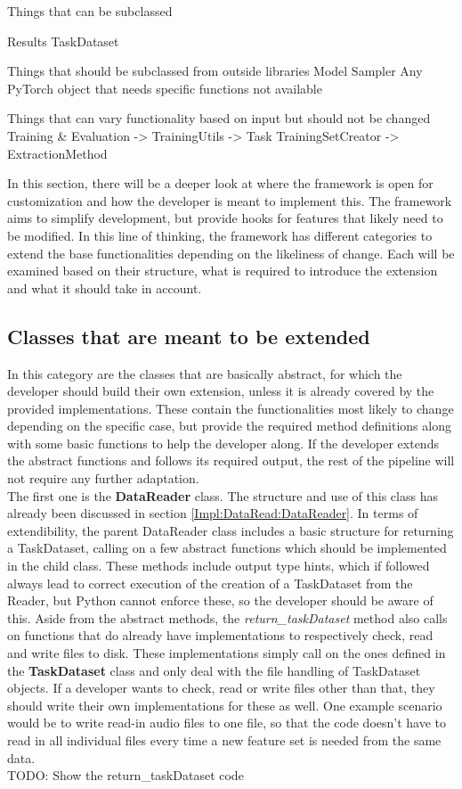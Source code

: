 Things that can be subclassed

Results
TaskDataset

Things that should be subclassed from outside libraries
Model
Sampler
Any PyTorch object that needs specific functions not available

Things that can vary functionality based on input but should not be changed
Training \& Evaluation
-> TrainingUtils
-> Task
TrainingSetCreator
-> ExtractionMethod

In this section, there will be a deeper look at where the framework is open for customization and how the developer is meant to implement this. The framework aims to simplify development, but provide hooks for features that likely need to be modified. In this line of thinking, the framework has different categories to extend the base functionalities depending on the likeliness of change. Each will be examined based on their structure, what is required to introduce the extension and what it should take in account. 

\subsection{Classes that are meant to be extended}

In this category are the classes that are basically abstract, for which the developer should build their own extension, unless it is already covered by the provided implementations. These contain the functionalities most likely to change depending on the specific case, but provide the required method definitions along with some basic functions to help the developer along. If the developer extends the abstract functions and follows its required output, the rest of the pipeline will not require any further adaptation. \\

The first one is the \textbf{DataReader} class. The structure and use of this class has already been discussed in section \ref{Impl:DataRead:DataReader}. In terms of extendibility, the parent DataReader class includes a basic structure for returning a TaskDataset, calling on a few abstract functions which should be implemented in the child class. These methods include output type hints, which if followed always lead to correct execution of the creation of a TaskDataset from the Reader, but Python cannot enforce these, so the developer should be aware of this. Aside from the abstract methods, the \textit{return\_taskDataset} method also calls on functions that do already have implementations to respectively check, read and write files to disk. These implementations simply call on the ones defined in the \textbf{TaskDataset} class and only deal with the file handling of TaskDataset objects. If a developer wants to check, read or write files other than that, they should write their own implementations for these as well. One example scenario would be to write read-in audio files to one file, so that the code doesn't have to read in all individual files every time a new feature set is needed from the same data.\\
TODO: Show the return\_taskDataset code


